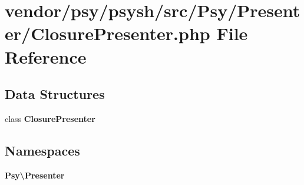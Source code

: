 \section{vendor/psy/psysh/src/\+Psy/\+Presenter/\+Closure\+Presenter.php File Reference}
\label{_closure_presenter_8php}
\subsection*{Data Structures}
\begin{DoxyCompactItemize}
\item 
class {\bf Closure\+Presenter}
\end{DoxyCompactItemize}
\subsection*{Namespaces}
\begin{DoxyCompactItemize}
\item 
 {\bf Psy\textbackslash{}\+Presenter}
\end{DoxyCompactItemize}
